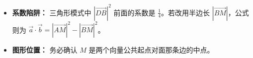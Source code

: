 \begin{trapbox}
\begin{itemize}
    \item \textbf{系数陷阱：} 三角形模式中 $|\vec{DB}|^2$ 前面的系数是 $\frac{1}{4}$。若改用半边长 $|\vec{BM}|$，公式则为 $\vec{a} \cdot \vec{b} = |\vec{AM}|^2 - |\vec{BM}|^2$。
    \item \textbf{图形位置：} 务必确认 $M$ 是两个向量公共起点对面那条边的中点。
\end{itemize}
\end{trapbox}